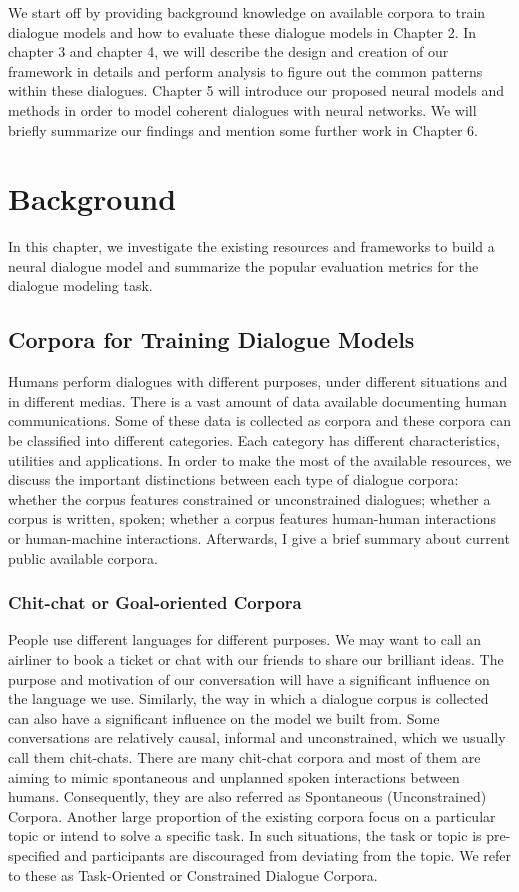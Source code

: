 \documentclass[bsc,frontabs,twoside,singlespacing,parskip,deptreport]{infthesis}     %
\begin{document}
We start off by providing background knowledge on available corpora to train dialogue models and how to evaluate these dialogue models in Chapter 2. In chapter 3 and chapter 4, we will describe the design and creation of our framework in details and perform analysis to figure out the common patterns within these dialogues. Chapter 5 will introduce our proposed neural models and methods in order to model coherent dialogues with neural networks. We will briefly summarize our findings and mention some further work in Chapter 6.

\chapter{Background}

In this chapter, we investigate the existing resources and frameworks to build a neural dialogue model and summarize the popular evaluation metrics for the dialogue modeling task.

\section{Corpora for Training Dialogue Models}

Humans perform dialogues with different purposes, under different situations and in different medias. There is a vast amount of data available documenting human communications. Some of these data is collected as corpora and these corpora can be classified into different categories. Each category has different characteristics, utilities and applications. In order to make the most of the available resources, we discuss the important distinctions between each type of dialogue corpora: whether the corpus features constrained or unconstrained dialogues; whether a corpus is written, spoken; whether a corpus features human-human interactions or human-machine interactions. Afterwards, I give a brief summary about current public available corpora.

\subsection{Chit-chat or Goal-oriented Corpora}

People use different languages for different purposes. We may want to call an airliner to book a ticket or chat with our friends to share our brilliant ideas. The purpose and motivation of our conversation will have a significant influence on the language we use. Similarly, the way in which a dialogue corpus is collected can also have a significant influence on the model we built from. Some conversations are relatively causal, informal and unconstrained, which we usually call them chit-chats. There are many chit-chat corpora and most of them are aiming to mimic spontaneous and unplanned spoken interactions between humans. Consequently, they are also referred as Spontaneous (Unconstrained) Corpora\cite{serban2018survey}. Another large proportion of the existing corpora focus on a particular topic or intend to solve a specific task. In such situations, the task or topic is pre-specified and participants are discouraged from deviating from the topic. We refer to these as Task-Oriented or Constrained Dialogue Corpora.
\end{document}
